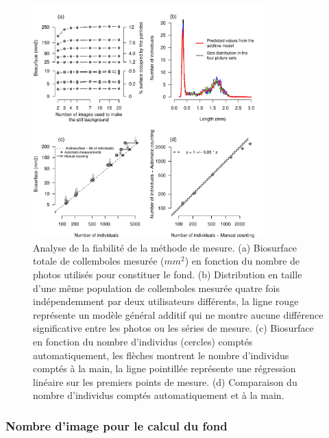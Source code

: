 \begin{figure}[!ht]
\begin{center}
\includegraphics[width=0.80\textwidth]{1_CorpsDeThese/Methodo/6_Plugin_multiP}
\caption[ Analyse de la
fiabilité]{Analyse de la fiabilité de la méthode de mesure. (a) Biosurface
totale de collemboles mesurée ($mm^2$) en fonction du nombre de photos utilisés
pour constituer le fond. (b) Distribution en taille d'une même population de
collemboles mesurée quatre fois indépendemment par deux utilisateurs
différents, la ligne rouge représente un modèle général additif qui ne montre
aucune différence significative entre les photos ou les séries de mesure. (c)
Biosurface en fonction du nombre d'individus (cercles) comptés automatiquement,
les flèches montrent le nombre d'individus comptés à la main, la ligne
pointillée représente une régression linéaire sur les premiers points de mesure.
(d) Comparaison du nombre d'individus comptés automatiquement et à la main. }
\label{fig:photofiabi}
\end{center}
\end{figure}

\subsubsection{Nombre d'image pour le calcul du fond}

